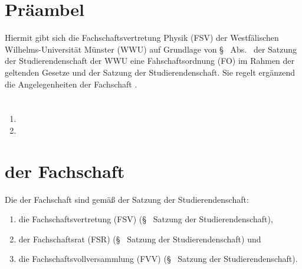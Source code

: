 \documentclass[
	a4paper,
	12pt,
	oneside,
	parskip=half-,
	pagesize,
	headsepline,
	german,
	ngerman
]{scrartcl}
\title{\replaced{Fachschafsordnung}{Satzung}}
\subtitle{der Fachschaft\deleted{svertretung} Physik\\
der Westfälischen Wilhelms-Universität Münster}
\date{in der Fassung vom \formatdate{11}{11}{2011}}
\author{}
\begin{document}
\maketitle

\section{Präambel}
Hiermit gibt sich die Fachschaftsvertretung Physik (FSV) der Westfälischen Wilhelms-Universi\-tät Münster (WWU) auf Grundlage von §~ Abs.~ der Satzung der Studierendenschaft der WWU eine Fahschaftsordnung (FO) im Rahmen der geltenden Gesetze und der Satzung der Studierendenschaft. Sie regelt ergänzend die Angelegenheiten der Fachschaft .


\section{}
\begin{enumerate}
	\item {}
	\item {}
\end{enumerate}

\setcounter{section}{1}
\section{ der Fachschaft}
Die  der Fachschaft sind gemäß der Satzung der Studierendenschaft:
\begin{enumerate}
	\item die Fachschaftsvertretung (FSV) (§~ Satzung der Studierendenschaft),
	\item der Fachschaftsrat (FSR) (§~ Satzung der Studierendenschaft) und 
	\item die Fachschaftsvollversammlung (FVV) (§~ Satzung der Studierendenschaft).
\end{enumerate}
\end{document}

